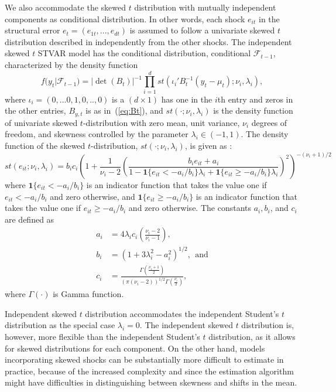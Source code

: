\documentclass[nojss]{jss}
\begin{document}
We also accommodate the skewed $t$ distribution with mutually independent components as conditional distribution. In other words, each shock $e_{it}$ in the structural error $e_t=(e_{1t},...,e_{dt})$ is assumed to follow a univariate skewed $t$ distribution described in \citet[][Section~2.4]{Hansen:1994} independently from the other shocks. The independent skewed $t$ STVAR model has the conditional distribution, conditional $\mathcal{F}_{t-1}$, characterized by the density function
%
\begin{equation}
f(y_t|\mathcal{F}_{t-1}) = |\det(B_t)|^{-1}\prod_{i=1}^d st(\iota_i'B_t^{-1}(y_t - \mu_t);\nu_i,\lambda_i),
\end{equation}
%
where $\iota_i=(0,...0,1,0,..,0)$ is a $(d\times 1)$ has one in the $i$th entry and zeros in the other entries, $B_{y,t}$ is as in~(\ref{eq:Bt}), and $st(\cdot;\nu_i,\lambda_i)$ is the density function of univariate skewed $t$-distribution with zero mean, unit variance, $\nu_i$ degrees of freedom, and skewness controlled by the parameter $\lambda_i\in (-1, 1)$. The density function of the skewed $t$-distribution, $st(\cdot; \nu_i, \lambda_i)$, is given as \citep[][Equations~(10)-(13)]{Hansen:1994}:
%
\begin{equation}\label{eq:skew_t_dens}
st(e_{it}; \nu_i, \lambda_i) = b_ic_i\left(1 + \frac{1}{\nu_i - 2}\left(\frac{b_ie_{it} + a_i}{1 - \boldsymbol{1}\lbrace e_{it}<-a_i/b_i  \rbrace\lambda_i + \boldsymbol{1}\lbrace e_{it}\geq -a_i/b_i \rbrace\lambda_i} \right)^2 \right)^{-(\nu_i + 1)/2}
\end{equation}
%
where $\boldsymbol{1} \lbrace e_{it}<-a_i/b_i \rbrace$ is an indicator function that takes the value one if $e_{it}<-a_i/b_i$ and zero otherwise, and $\boldsymbol{1}\lbrace e_{it}\geq -a_i/b_i\rbrace$ is an indicator function that takes the value one if $e_{it}\geq -a_i/b_i$ and zero otherwise. The constants $a_i, b_i$, and $c_i$ are defined as
\begin{align}
a_i &= 4\lambda_i c_i\left(\frac{\nu_i - 2}{\nu_i - 1}\right),\\
b_i &= (1 + 3\lambda_i^2 - a_i^2)^{1/2}, \ \ \text{and}\\
c_i &= \frac{\Gamma \left(\frac{\nu_i + 1}{2}\right)}{(\pi(\nu_i - 2))^{1/2}\Gamma\left(\frac{\nu_i}{2}\right)},\label{eq:skew_t_dens_c}
\end{align}
where $\Gamma(\cdot)$ is Gamma function.

Independent skewed $t$ distribution accommodates the independent Student's $t$ distribution as the special case $\lambda_i=0$. The independent skewed $t$ distribution is, however, more flexible than the independent Student's $t$ distribution, as it allows for skewed distributions for each component. On the other hand, models incorporating skewed shocks can be substantially more difficult to estimate in practice, because of the increased complexity and since the estimation algorithm might have difficulties in distinguishing between skewness and shifts in the mean.
\end{document}
